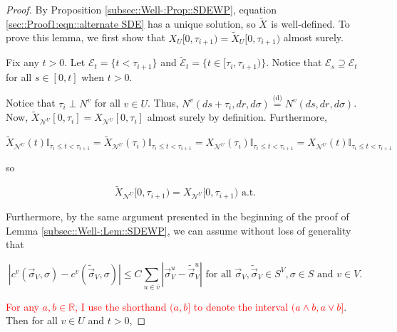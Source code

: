 \documentclass[12pt]{article}
\newcommand{\mb}{\mathbb}
\newcommand{\mc}{\mathcal}
\newcommand{\ov}{\overline}
\newcommand{\te}{\text}
\newcommand{\tr}{\textcolor{red}}
\newcommand{\ind}{\hspace{24pt}}
\newcommand{\deq}{\overset{\text{(d)}}{=}}			%
\renewcommand{\v}{v}							%
\newcommand{\vv}{u}								%
\renewcommand{\U}{U}							%
\renewcommand{\S}{S}							%
\newcommand{\s}{\sigma}							%
\newcommand{\sv}{\vec{\s}}						%
\renewcommand{\t}{t}							%
\renewcommand{\tt}{s}							%
\newcommand{\X}{X}								%
\newcommand{\IGr}{c}							%
\newcommand{\neigh}{\mc{N}}						%
\newcommand{\vind}[1]{^{#1}}					%
\newcommand{\carp}[1]{^{#1}}					%
\newcommand{\vsi}[1]{^{#1}}						%
\newcommand{\cind}[1]{_{#1}}					%
\newcommand{\cl}{\ov}							%
\newcommand{\tp}[1]{(#1)}						%
\newcommand{\tip}[1]{#1}						%
\newcommand{\ts}[1]{_{#1}}						%
\newcommand{\const}{C}							%
\newcommand{\poiss}{N}							%
\newcommand{\alt}[1]{\widetilde{#1}}			%
\newcommand{\indx}[1]{_{#1}}					%
\newcommand{\rt}{\tau}							%
\newcommand{\evnt}{\mc{E}}						%
\begin{document}
\begin{proof}
\ind By Proposition \ref{subsec::Well-:Prop::SDEWP}, equation \eqref{sec::Proof1:eqn::alternate SDE} has a unique solution, so \(\alt{\X}\cind{}\tip{}\) is well-defined. To prove this lemma, we first show that \(\X\cind{\U}\tip{[0,\rt\indx{i+1})} = \alt{\X}\cind{\U}\tip{}{[0,\rt\indx{i+1})}\) almost surely. 

\ind Fix any \(\t > 0\). Let \(\evnt\ts{\t} = \{\t < \rt\indx{i+1}\}\) and \(\alt{\evnt}\ts{\t} = \{\t\in [\rt\indx{i},\rt\indx{i+1})\}\). Notice that \(\evnt\ts{\tt} \supseteq \evnt\ts{\t}\) for all \(\tt\in [0,\t]\) when \(\t > 0\). 

\ind Notice that \(\rt\indx{i} \perp \poiss\vind{\v}\) for all \(\v \in \U\). Thus, \(\poiss\vind{\v}(d\tt+\rt\indx{i},dr,d\s) \deq \poiss\vind{\v}(d\tt,dr,d\s)\). Now, \(\alt{\X}\cind{\neigh\vind{\U}}\tip{[0,\rt\indx{i}]} = \X\cind{\neigh\vind{\U}}\tip{[0,\rt\indx{i}]}\) almost surely by definition. Furthermore,

\[\alt{\X}\cind{\neigh\vind{\U}}\tp{\t}\mb{I}_{\rt\indx{i}\leq \t < \rt\indx{i+1}} = \alt{\X}\cind{\neigh\vind{\U}}\tp{\rt\indx{i}}\mb{I}_{\rt\indx{i}\leq \t < \rt\indx{i+1}} = \X\cind{\neigh\vind{\U}}\tp{\rt\indx{i}}\mb{I}_{\rt\indx{i}\leq \t < \rt\indx{i+1}} = \X\cind{\neigh\vind{\U}}\tp{\t}\mb{I}_{\rt\indx{i}\leq \t < \rt\indx{i+1}}\]

so

\[\alt{\X}\cind{\neigh\vind{\U}}\tip{[0,\rt\indx{i+1})} = \X\cind{\neigh\vind{\U}}\tip{[0,\rt\indx{i+1})} \te{ a.t.}\]

Furthermore, by the same argument presented in the beginning of the proof of Lemma \ref{subsec::Well-:Lem::SDEWP}, we can assume without loss of generality that 

\[|\IGr\vind{\v}(\sv\cind{V}\vsi{},\s) - \IGr\vind{\v}(\alt{\sv}\cind{V}\vsi{},\s)| \leq \const\indx{}\sum_{\vv\in \cl{\v}} |\sv\cind{V}\vsi{\vv} - \alt{\sv}\cind{V}\vsi{\vv}|\te{ for all } \sv\cind{V}\vsi{},\alt{\sv}\cind{V}\vsi{}\in \S\carp{V},\s \in \S \te{ and } \v \in V.\]

\tr{For any \(a,b\in \mb{R}\), I use the shorthand \((a,b]\) to denote the interval \((a\wedge b,a\vee b]\)}. Then for all \(v\in \U\) and \(\t > 0\),


\end{proof}
\end{document}
